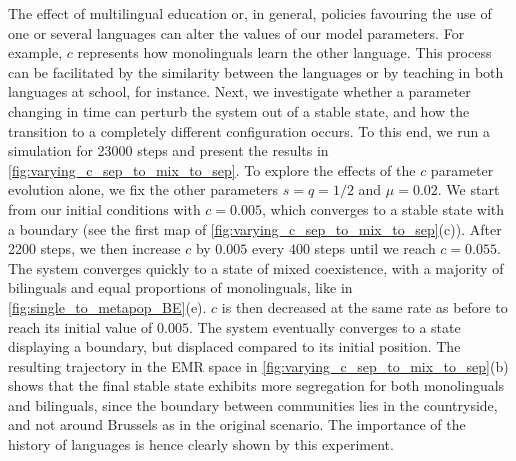 \documentclass[../thesis.tex]{subfiles}
\begin{document}
The effect of multilingual education or, in general, policies favouring the use of one
or several languages can alter the values of our model parameters. For example, $c$
represents how monolinguals learn the other language. This process can be facilitated by
the similarity between the languages or by teaching in both languages at school, for
instance. Next, we investigate whether a parameter changing in time can perturb the
system out of a stable state, and how the transition to a completely different
configuration occurs. To this end, we run a simulation for 23000 steps and present the
results in \cref{fig:varying_c_sep_to_mix_to_sep}. To explore the effects of the $c$
parameter evolution alone, we fix the other parameters $s = q = 1/2$ and $\mu = 0.02$.
We start from our initial conditions with $c = 0.005$, which converges to a stable state
with a boundary (see the first map of \cref{fig:varying_c_sep_to_mix_to_sep}(c)). After
2200 steps, we then increase $c$ by $0.005$ every $400$ steps until we reach $c =
0.055$. The system converges quickly to a state of mixed coexistence, with a majority of
bilinguals and equal proportions of monolinguals, like in
\cref{fig:single_to_metapop_BE}(e). $c$ is then decreased at the same rate as before to
reach its initial value of $0.005$. The system eventually converges to a state
displaying a boundary, but displaced compared to its initial position. The resulting
trajectory in the \ac{EMR} space in \cref{fig:varying_c_sep_to_mix_to_sep}(b) shows that
the final stable state exhibits more segregation for both monolinguals and bilinguals,
since the boundary between communities lies in the countryside, and not around Brussels
as in the original scenario. The importance of the history of languages is hence clearly
shown by this experiment.
\end{document}
